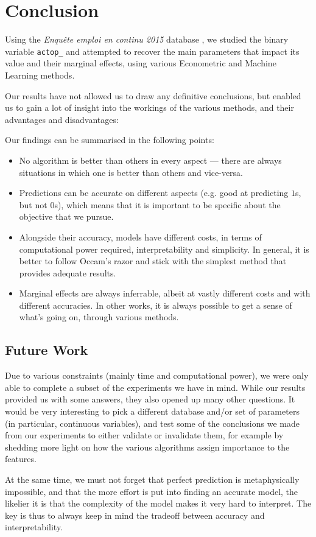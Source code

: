 \chapter{Conclusion}

Using the \textit{Enqu\^ete emploi en continu 2015} database \cite{enquete}, we studied the binary variable \texttt{actop\_} and attempted to recover the main parameters that impact its value and their marginal effects, using various Econometric and Machine Learning methods.

Our results have not allowed us to draw any definitive conclusions, but enabled us to gain a lot of insight into the workings of the various methods, and their advantages and disadvantages:

Our findings can be summarised in the following points:

\begin{itemize}
    \item No algorithm is better than others in every aspect --- there are always situations in which one is better than others and vice-versa.
    \item Predictions can be accurate on different aspects (e.g. good at predicting $1$s, but not $0$s), which means that it is important to be specific about the objective that we pursue.
    \item Alongside their accuracy, models have different costs, in terms of computational power required, interpretability and simplicity. In general, it is better to follow Occam's razor and stick with the simplest method that provides adequate results.
    \item Marginal effects are always inferrable, albeit at vastly different costs and with different accuracies. In other works, it is always possible to get a sense of what’s going on, through various methods.
\end{itemize}

\section{Future Work}

Due to various constraints (mainly time and computational power), we were only able to complete a subset of the experiments we have in mind. While our results provided us with some answers, they also opened up many other questions. It would be very interesting to pick a different database and/or set of parameters (in particular, continuous variables), and test some of the conclusions we made from our experiments to either validate or invalidate them, for example by shedding more light on how the various algorithms assign importance to the features.

At the same time, we must not forget that perfect prediction is metaphysically impossible, and that the more effort is put into finding an accurate model, the likelier it is that the complexity of the model makes it very hard to interpret. The key is thus to always keep in mind the tradeoff between accuracy and interpretability.

\newpage\null\thispagestyle{empty}\newpage  %
